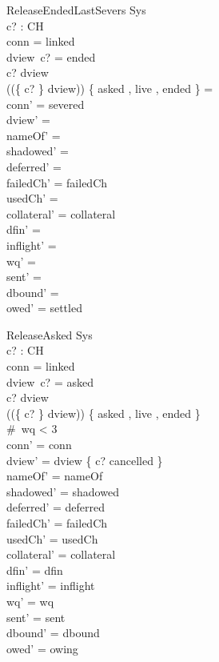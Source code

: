 \documentclass[a4paper,10pt,fleqn]{article}
\begin{document}
\begin{schema}{ReleaseEndedLastSevers}
  \Delta Sys \\
  c? : CH \\
\where
  conn = linked \\
  dview~c? = ended \\
  c? \in \dom dview \\
  (\ran (\{ c? \} \ndres dview)) \cap \{ asked , live , ended \} = \emptyset \\
  conn' = severed \\
  dview' = \emptyset \\
  nameOf' = \emptyset \\
  shadowed' = \emptyset \\
  deferred' = \emptyset \\
  failedCh' = failedCh \\
  usedCh' = \emptyset \\
  collateral' = collateral \\
  dfin' = \emptyset \\
  inflight' = \langle \rangle \\
  wq' = \langle \rangle \\
  sent' = \langle \rangle \\
  dbound' = \emptyset \\
  owed' = settled
\end{schema}

\begin{schema}{ReleaseAsked}
  \Delta Sys \\
  c? : CH \\
\where
  conn = linked \\
  dview~c? = asked \\
  c? \in \dom dview \\
  (\ran (\{ c? \} \ndres dview)) \cap \{ asked , live , ended \} \neq \emptyset \\
  \#~wq < 3 \\
  conn' = conn \\
  dview' = dview \oplus \{ c? \mapsto cancelled \} \\
  nameOf' = nameOf \\
  shadowed' = shadowed \\
  deferred' = deferred \\
  failedCh' = failedCh \\
  usedCh' = usedCh \\
  collateral' = collateral \\
  dfin' = dfin \\
  inflight' = inflight \\
  wq' = wq \\
  sent' = sent \\
  dbound' = dbound \\
  owed' = owing
\end{schema}
\end{document}
